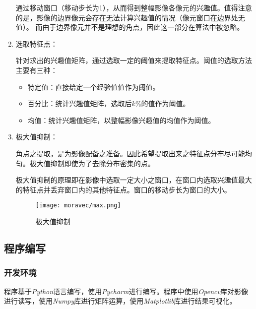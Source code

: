 \begin{enumerate}
            通过移动窗口（移动步长为1），从而得到整幅影像各像元的兴趣值。值得注意的是，影像的边界像元会存在无法计算兴趣值的情况（像元窗口在边界处无值）。
            而由于边界像元并不是理想的角点，因此这一部分在算法中被忽略。

            \item 选取特征点：
            
            \hspace{20pt}针对求出的兴趣值矩阵，通过选取一定的阈值来提取特征点。阈值的选取方法主要有三种：
                \begin{itemize}
                    \item 特定值：直接给定一个经验值值作为阈值。
                    \item 百分比：统计兴趣值矩阵，选取后$k\%$的值作为阈值。
                    \item 均值：统计兴趣值矩阵，以整幅影像兴趣值的均值作为阈值。
                \end{itemize}

            \item 极大值抑制：
            
            \hspace{20pt}角点之提取，是为影像配备之准备。因此希望提取出来之特征点分布尽可能均匀。极大值抑制即使为了去除分布密集的点。
            
            \hspace{20pt}极大值抑制的原理即在影像中选取一定大小之窗口，在窗口内选取兴趣值最大的特征点并丢弃窗口内的其他特征点。窗口的移动步长为窗口的大小。
            \begin{figure}[H]
                \centering 
                \texttt{[image: moravec/max.png]}
                \caption{极大值抑制}
                \label{maxpool}
            \end{figure}

        \end{enumerate}


\subsection{程序编写}
    \subsubsection{开发环境}
        程序基于\textit{Python}语言编写，使用\textit{Pycharm}进行编写。程序中使用\textit{Opencv}库对影像进行读写，使用\textit{Numpy}库进行矩阵运算，使用\textit{Matplotlib}库进行结果可视化。
